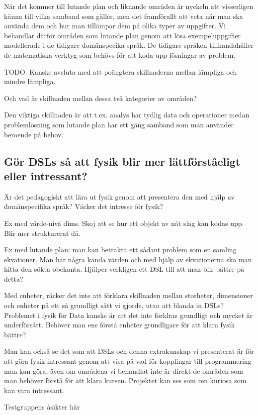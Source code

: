 \begin{binge}
När det kommer till lutande plan och liknande områden är nyckeln att visserligen känna till vilka samband som gäller, men det framförallt att veta när man ska använda dem och hur man tillämpar dem på olika typer av uppgifter. Vi behandlar därför områden som lutande plan genom att lösa exempeluppgifter modellerade i de tidigare domänspecika språk. De tidigare språken tillhandahåller de matematiska verktyg som behövs för att koda upp lösningar av problem.


TODO: Kanske avsluta med att poängtera skillnaderna mellan lämpliga och mindre lämpliga.

Och vad är skillnaden mellan dessa två kategorier av områden?

Den viktiga skillnaden är att t.ex. analys har tydlig data och operationer
medan problemlösning som lutande plan har ett gäng samband som man använder
beroende på behov.

\subsection{Gör DSLs så att fysik blir mer lättförståeligt eller intressant?}
\label{sec:bara_fysik}

Är det pedagogiskt att lära ut fysik genom att presentera den med hjälp av domänspecifika språk? Väcker det intresse för fysik?

Ex med värde-nivå dims. Skoj att se hur ett objekt av nåt slag kan kodas upp. Blir mer strukturerat då.

Ex med lutande plan: man kan betrakta ett sådant problem som en samling ekvationer. Man har några kända värden och med hjälp av ekvationerna ska man hitta den sökta obekanta. Hjälper verkligen ett DSL till att man blir bättre på detta?

Med enheter, räcker det inte att förklara skillnaden mellan storheter, dimensioner och enheter på ett så grundligt sätt vi gjorde, utan att blanda in DSLs? Problemet i fysik för Data kanske är att det inte förklras grundligt och mycket är underförsått. Behöver man ens förstå enheter grundligare för att klara fysik bättre?

Man kan också se det som att DSLs och denna extrakunskap vi presenterat är för att göra fysik intressant genom att visa på vad för kopplingar till programmering man kan göra, även om områdena vi behandlat inte är direkt de områden som man behöver förstå för att klara kursen. Projektet kan ses som ren kuriosa som kan vara intressant.

Testgruppens åsikter här


\end{binge}
